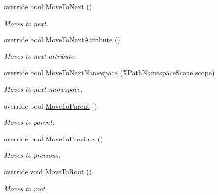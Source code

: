 \begin{DoxyCompactItemize}
override bool \hyperlink{class_html_agility_pack_1_1_html_node_navigator_a79cba8a157ccdf5e84059f1c0b65478f}{Move\+To\+Next} ()
\begin{DoxyCompactList}\small\item\em Moves to next. \end{DoxyCompactList}\item 
override bool \hyperlink{class_html_agility_pack_1_1_html_node_navigator_a049a7cf5bfa4a0d2af2cf41a997edc21}{Move\+To\+Next\+Attribute} ()
\begin{DoxyCompactList}\small\item\em Moves to next attribute. \end{DoxyCompactList}\item 
override bool \hyperlink{class_html_agility_pack_1_1_html_node_navigator_ac9bda3370936604949129419e5391de9}{Move\+To\+Next\+Namespace} (X\+Path\+Namespace\+Scope scope)
\begin{DoxyCompactList}\small\item\em Moves to next namespace. \end{DoxyCompactList}\item 
override bool \hyperlink{class_html_agility_pack_1_1_html_node_navigator_a8311f3f39aa7bd70759d17c8a5f818cb}{Move\+To\+Parent} ()
\begin{DoxyCompactList}\small\item\em Moves to parent. \end{DoxyCompactList}\item 
override bool \hyperlink{class_html_agility_pack_1_1_html_node_navigator_ac9b5c01a44a3af6b6c83c1a2feae579d}{Move\+To\+Previous} ()
\begin{DoxyCompactList}\small\item\em Moves to previous. \end{DoxyCompactList}\item 
override void \hyperlink{class_html_agility_pack_1_1_html_node_navigator_a8936111aa11047198917172e0cf79a36}{Move\+To\+Root} ()
\begin{DoxyCompactList}\small\item\em Moves to root. \end{DoxyCompactList}\end{DoxyCompactItemize}
